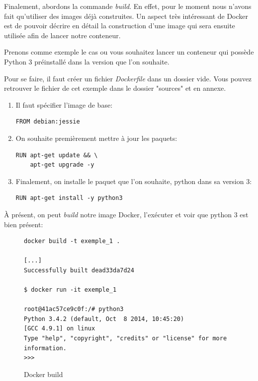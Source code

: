 Finalement, abordons la commande \emph{build}. En effet, pour le moment nous n'avons fait qu'utiliser des images déjà construites. Un aspect très intéressant de Docker est de pouvoir décrire en détail la construction d'une image qui sera ensuite utilisée afin de lancer notre conteneur.

Prenons comme exemple le cas ou vous souhaitez lancer un conteneur qui possède Python 3 préinstallé dans la version que l'on souhaite.

Pour se faire, il faut créer un fichier \emph{Dockerfile} dans un dossier vide. Vous pouvez retrouver le fichier de cet exemple dans le dossier "sources" et en annexe.

\begin{enumerate}
\item Il faut spécifier l'image de base:
\begin{lstlisting}[frame=single]
FROM debian:jessie
\end{lstlisting}

\item On souhaite premièrement mettre à jour les paquets:
\begin{lstlisting}[frame=single]
RUN apt-get update && \
    apt-get upgrade -y
\end{lstlisting}

\item Finalement, on installe le paquet que l'on souhaite, python dans sa version 3:
\begin{lstlisting}[frame=single]
RUN apt-get install -y python3
\end{lstlisting}

\end{enumerate}

À présent, on peut \emph{build} notre image Docker, l'exécuter et voir que python 3 est bien présent:

\begin{figure}[H] 
\centering 
\begin{lstlisting}[frame=single]
docker build -t exemple_1 .

[...]
Successfully built dead33da7d24

$ docker run -it exemple_1

root@41ac57ce9c0f:/# python3
Python 3.4.2 (default, Oct  8 2014, 10:45:20) 
[GCC 4.9.1] on linux
Type "help", "copyright", "credits" or "license" for more information.
>>> 

\end{lstlisting}
\caption[Docker build]{Docker build}
\label{fig:dockerBuild} 
\end{figure}

